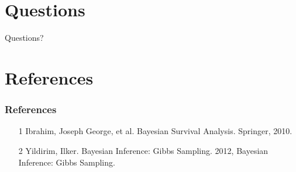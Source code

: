 \documentclass{beamer}
\begin{document}
\section{Questions}
\begin{frame}[c]
\begin{center}
\Huge
Questions? 
\end{center}
\end{frame}

\section{References}
\begin{frame}
\frametitle{References}
\begin{enumerate}
\item[1] Ibrahim, Joseph George, et al. Bayesian Survival Analysis. Springer, 2010.
\item[2] Yildirim, Ilker. Bayesian Inference: Gibbs Sampling. 2012, Bayesian Inference: Gibbs Sampling.
\end{enumerate}
\end{frame}
\end{document}
